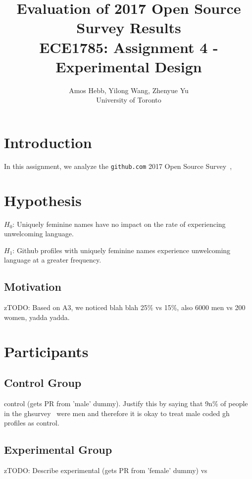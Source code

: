 \documentclass[journal,12pt,onecolumn,]{IEEEtran}
\begin{document}
\title{Evaluation of 2017 Open Source Survey Results \\
{\normalsize ECE1785: Assignment 4 - Experimental Design}}

\author{Amos Hebb, Yilong Wang, Zhenyue Yu\\ \small University of Toronto}

\maketitle

\section{Introduction}

In this assignment, we analyze the \texttt{github.com} 2017 Open Source Survey~\cite{gitHubOpenSourceSurvey2017},

\section{Hypothesis}

$H_0$: Uniquely feminine names have no impact on the rate of experiencing unwelcoming language.

$H_1$: Github profiles with uniquely feminine names experience unwelcoming language at a greater frequency.

\subsection{Motivation}

zTODO: Based on A3, we noticed blah blah 25\% vs 15\%, also 6000 men vs 200 women, yadda yadda.


\section{Participants}

\subsection{Control Group}
control (gets PR from 'male' dummy). Justify this by saying that 9n\% of people in the ghsurvey~\cite{gitHubOpenSourceSurvey2017} were men and therefore it is okay to treat male coded gh profiles as control.

\subsection{Experimental Group}
zTODO: Describe experimental (gets PR from 'female' dummy) vs
\end{document}
